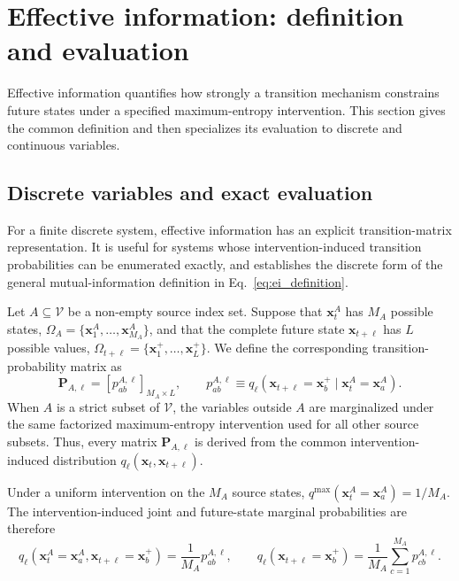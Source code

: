 \section{Effective information: definition and evaluation}
\label{app:effective_information}
Effective information quantifies how strongly a transition mechanism constrains future states under a specified maximum-entropy intervention. This section gives the common definition and then specializes its evaluation to discrete and continuous variables.\subsection{Discrete variables and exact evaluation}
\label{app:discrete_ei}

For a finite discrete system, effective information has an explicit transition-matrix representation. 
It is useful
for systems whose intervention-induced transition probabilities can be
enumerated exactly, and establishes the discrete form of the general
mutual-information definition in Eq.~\eqref{eq:ei_definition}.

Let \(A\subseteq\mathcal{V}\) be a non-empty source index set. Suppose that
\(\boldsymbol{x}_{t}^{A}\) has \(M_A\) possible states,
\(\Omega_A=\{\boldsymbol{x}_1^{A},\ldots,\boldsymbol{x}_{M_A}^{A}\}\), and
that the complete future state \(\boldsymbol{x}_{t+\ell}\) has \(L\) possible
values,
\(\Omega_{t+\ell}
=\{\boldsymbol{x}_1^{+},\ldots,\boldsymbol{x}_{L}^{+}\}\).
We define the corresponding transition-probability matrix as
\begin{equation}
    \mathbf{P}_{A,\ell}
    =
    \left[
        p_{ab}^{A,\ell}
    \right]_{M_A\times L},
    \qquad
    p_{ab}^{A,\ell}
    \equiv
    q_{\ell}
    \left(
        \boldsymbol{x}_{t+\ell}=\boldsymbol{x}_b^{+}
        \mid
        \boldsymbol{x}_{t}^{A}=\boldsymbol{x}_a^{A}
    \right).
    \label{eq:app_transition_matrix}
\end{equation}
When \(A\) is a strict subset of \(\mathcal{V}\), the variables outside \(A\)
are marginalized under the same factorized maximum-entropy intervention used
for all other source subsets. Thus, every matrix \(\mathbf{P}_{A,\ell}\) is
derived from the common intervention-induced distribution
\(q_{\ell}(\boldsymbol{x}_{t},\boldsymbol{x}_{t+\ell})\).

Under a uniform intervention on the \(M_A\) source states,
\(q^{\max}(\boldsymbol{x}_{t}^{A}=\boldsymbol{x}_a^{A})=1/M_A\).
The intervention-induced joint and future-state marginal probabilities are
therefore
\begin{equation}
    q_{\ell}
    \left(
        \boldsymbol{x}_{t}^{A}=\boldsymbol{x}_a^{A},
        \boldsymbol{x}_{t+\ell}=\boldsymbol{x}_b^{+}
    \right)
    =
    \frac{1}{M_A}p_{ab}^{A,\ell},
    \qquad
    q_{\ell}
    \left(
        \boldsymbol{x}_{t+\ell}=\boldsymbol{x}_b^{+}
    \right)
    =
    \frac{1}{M_A}
    \sum_{c=1}^{M_A}p_{cb}^{A,\ell}.
    \label{eq:app_discrete_probabilities}
\end{equation}


